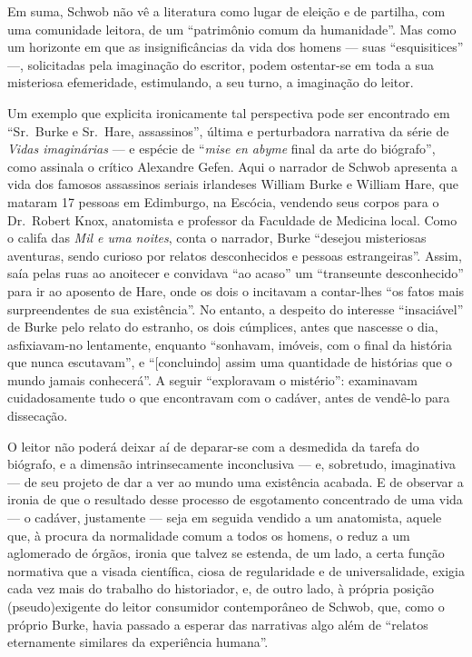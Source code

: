 Em suma, Schwob não vê a literatura como lugar de eleição e de partilha, com uma
comunidade leitora, de um “patrimônio comum da humanidade”. Mas como um
horizonte em que as insignificâncias da vida dos homens --- suas “esquisitices”
---, solicitadas pela imaginação do escritor, podem ostentar-se em toda a sua
misteriosa efemeridade, estimulando, a seu turno, a imaginação do leitor. 

Um exemplo que explicita ironicamente tal perspectiva pode ser encontrado em
``Sr.~Burke e Sr.~Hare, assassinos'', última e perturbadora narrativa da
série de \textit{Vidas imaginárias} --- e espécie de “\textit{mise en abyme}
final da arte do biógrafo”, como assinala o crítico Alexandre Gefen. Aqui o
narrador de Schwob apresenta a vida dos famosos assassinos seriais irlandeses
William Burke e William Hare, que mataram 17 pessoas em Edimburgo, na Escócia,
vendendo seus corpos para o Dr.~Robert Knox, anatomista e professor da
Faculdade de Medicina local. Como o califa das \textit{Mil e uma noites}, conta
o narrador, Burke “desejou misteriosas aventuras, sendo curioso por relatos
desconhecidos e pessoas estrangeiras”. Assim, saía pelas ruas ao anoitecer e
convidava “ao acaso” um “transeunte desconhecido” para ir ao aposento de Hare,
onde os dois o incitavam a contar-lhes “os fatos mais surpreendentes de sua
existência”. No entanto, a despeito do interesse “insaciável” de Burke pelo
relato do estranho, os dois cúmplices, antes que nascesse o dia, asfixiavam-no
lentamente, enquanto “sonhavam, imóveis, com o final da história que nunca
escutavam”, e “[concluindo] assim uma quantidade de histórias que o mundo
jamais conhecerá”. A seguir “exploravam o mistério”: examinavam cuidadosamente
tudo o que encontravam com o cadáver, antes de vendê-lo para dissecação. 


O leitor não poderá deixar aí de deparar-se com a desmedida da tarefa do
biógrafo, e a dimensão intrinsecamente inconclusiva --- e, sobretudo, imaginativa
--- de seu projeto de dar a ver ao mundo uma existência acabada. E de observar a
ironia de que o resultado desse processo de esgotamento concentrado de uma vida
--- o cadáver, justamente --- seja em seguida vendido a um anatomista, aquele que,
à procura da normalidade comum a todos os homens, o reduz a um aglomerado de
órgãos, ironia que talvez se estenda, de um lado, a certa função normativa que
a visada científica, ciosa de regularidade e de universalidade, exigia cada vez
mais do trabalho do historiador, e, de outro lado, à própria posição
(pseudo)exigente do leitor consumidor contemporâneo de Schwob, que, como o
próprio Burke, havia passado a esperar das narrativas algo além de “relatos
eternamente similares da experiência humana”.

